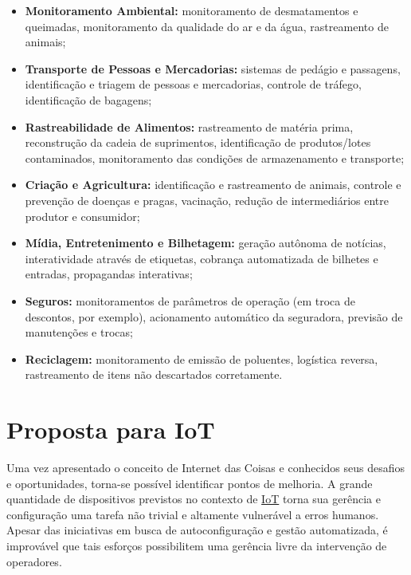 \documentclass[twoside,english,brazilian]{UNISINOSmonografia}
\begin{document}
\begin{itemize}
	\item \textbf{Monitoramento Ambiental:}
monitoramento de desmatamentos e queimadas, monitoramento da qualidade do ar e 
da água, rastreamento de animais;
	
	\item \textbf{Transporte de Pessoas e Mercadorias:}
sistemas de pedágio e passagens, identificação e triagem de pessoas e 
mercadorias, controle de tráfego, identificação de bagagens;
	
	\item \textbf{Rastreabilidade de Alimentos:}
rastreamento de matéria prima, reconstrução da cadeia de suprimentos, 
identificação de produtos/lotes contaminados, monitoramento das condições de 
armazenamento e transporte;
	
	\item \textbf{Criação e Agricultura:}
identificação e rastreamento de animais, controle e prevenção de doenças e 
pragas, vacinação, redução de intermediários entre produtor e consumidor;
	
	\item \textbf{Mídia, Entretenimento e Bilhetagem:}
geração autônoma de notícias, interatividade através de etiquetas, cobrança 
automatizada de bilhetes e entradas, propagandas interativas;
	
	\item \textbf{Seguros:}
monitoramentos de parâmetros de operação (em troca de descontos, por exemplo), 
acionamento automático da seguradora, previsão de manutenções e trocas;
	
	\item \textbf{Reciclagem:}
monitoramento de emissão de poluentes, logística reversa, rastreamento de 
itens não descartados corretamente.
	
\end{itemize}



\chapter{Proposta para IoT}

Uma vez apresentado o conceito de Internet das Coisas e conhecidos seus 
desafios e oportunidades, torna-se possível identificar pontos de melhoria.
A grande quantidade de dispositivos previstos no contexto de \hyperref[siglas]{IoT} torna sua 
gerência e configuração uma tarefa não trivial e altamente vulnerável a erros 
humanos.
Apesar das iniciativas em busca de autoconfiguração e gestão automatizada, é 
improvável que tais esforços possibilitem uma gerência livre da intervenção de 
operadores.
\end{document}

